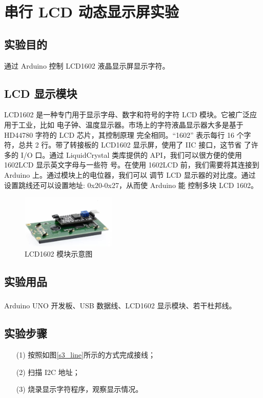 \documentclass[UTF8, oneside]{ctexbook}
\begin{document}
\chapter{串行 LCD 动态显示屏实验}
\section{实验目的}
通过 Arduino 控制 LCD1602 液晶显示屏显示字符。

\section{LCD 显示模块}
LCD1602 是一种专门用于显示字母、数字和符号的字符 LCD 模块。它被广泛应用于工业，比如
电子钟、温度显示器。市场上的字符液晶显示器大多是基于 HD44780 字符的 LCD 芯片，其控制原理
完全相同。“1602” 表示每行 16 个字符，总共 2 行。带了转接板的 LCD1602 显示屏，使用了 IIC 接口，这节省
了许多的 I/O 口。通过 LiquidCrystal 类库提供的 API，我们可以很方便的使用 1602LCD 显示英文字母与一些符
号。在使用 1602LCD 前，我们需要将其连接到 Arduino 上。通过模块上的电位器，我们可以
调节 LCD 显示器的对比度。通过设置跳线还可以设置地址: 0x20-0x27，从而使 Arduino 能
控制多块 LCD 1602。

\begin{figure}[h]
    \centering
    \includegraphics[width=0.4\textwidth]{./result/sensor/3/sensor.png}
    \caption{LCD1602 模块示意图}
    \label{3_sensor}
\end{figure}

\section{实验用品}
\paragraph{}
Arduino UNO 开发板、USB 数据线、LCD1602 显示模块、若干杜邦线。

\section{实验步骤}
\begin{itemize}
    \item[(1)] 按照如图\ref{s3_line}所示的方式完成接线；
    \item[(2)] 扫描 I2C 地址；
    \item[(3)] 烧录显示字符程序，观察显示情况。 
\end{itemize}
\end{document}
